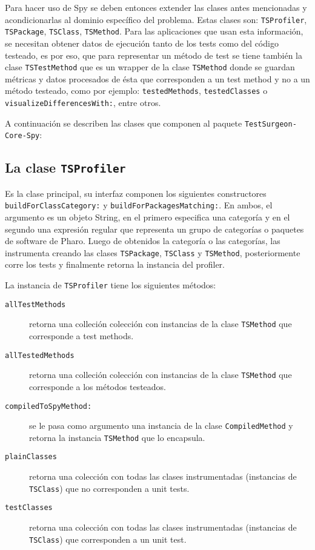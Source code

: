 
\par Para hacer uso de Spy se deben entonces extender las clases antes mencionadas y acondicionarlas al dominio específico del problema. Estas clases son: {\tt TSProfiler}, {\tt TSPackage}, {\tt TSClass}, {\tt TSMethod}. Para las aplicaciones que usan esta información, se necesitan obtener datos de ejecución tanto de los tests como del código testeado, es por eso, que para representar un método de test se tiene también la clase {\tt TSTestMethod} que es un wrapper de la clase {\tt TSMethod} donde se guardan métricas y datos procesados de ésta que corresponden a un test method y no a un método testeado, como por ejemplo: {\tt testedMethods}, {\tt testedClasses} o {\tt visualizeDifferencesWith:}, entre otros.

\par A continuación se describen las clases que componen al paquete {\tt TestSurgeon-Core-Spy}:

\subsection{La clase {\tt TSProfiler}}

\par Es la clase principal, su interfaz componen los siguientes constructores {\tt buildForClassCategory:} y {\tt buildForPackagesMatching:}. En ambos, el argumento es un objeto String, en el primero especifica una categoría y en el segundo una expresión regular que representa un grupo de categorías o paquetes de software de Pharo. Luego de obtenidos la categoría o las categorías, las instrumenta creando las clases {\tt TSPackage}, {\tt TSClass} y {\tt TSMethod}, posteriormente corre los tests y finalmente retorna la instancia del profiler.

\par La instancia de {\tt TSProfiler} tiene los siguientes métodos:

\begin{description}
\item[{\tt allTestMethods}] retorna una colleción colección con instancias de la clase {\tt TSMethod} que corresponde a test methods.
\item[{\tt allTestedMethods}] retorna una colleción colección con instancias de la clase {\tt TSMethod} que corresponde a los métodos testeados.
\item[{\tt compiledToSpyMethod:}] se le pasa como argumento una instancia de la clase {\tt CompiledMethod} y retorna la instancia {\tt TSMethod} que lo encapsula.
\item[{\tt plainClasses}] retorna una colección con todas las clases instrumentadas (instancias de {\tt TSClass}) que no corresponden a unit tests.
\item[{\tt testClasses}] retorna una colección con todas las clases instrumentadas (instancias de {\tt TSClass}) que corresponden a un unit test.
\end{description}

